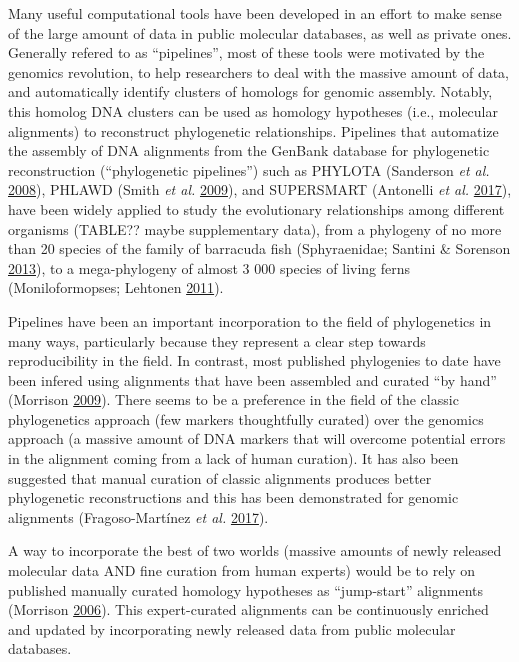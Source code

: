 \documentclass[]{article}
\begin{document}
Many useful computational tools have been developed in an effort to make sense of the large amount of data in public molecular databases, as well as private ones. Generally refered to as ``pipelines'', most of these tools were motivated by the genomics revolution, to help researchers to deal with the massive amount of data, and automatically identify clusters of homologs for genomic assembly. Notably, this homolog DNA clusters can be used as homology hypotheses (i.e., molecular alignments) to reconstruct phylogenetic relationships.
Pipelines that automatize the assembly of DNA alignments from the GenBank database for phylogenetic reconstruction (``phylogenetic pipelines'') such as PHYLOTA (Sanderson \emph{et al.} \protect\hyperlink{ref-sanderson2008phylota}{2008}), PHLAWD (Smith \emph{et al.} \protect\hyperlink{ref-smith2009mega}{2009}), and SUPERSMART (Antonelli \emph{et al.} \protect\hyperlink{ref-antonelli2017toward}{2017}), have been widely applied to study the evolutionary relationships among different organisms (TABLE?? maybe supplementary data), from a phylogeny of no more than 20 species of the family of barracuda fish (Sphyraenidae; Santini \& Sorenson \protect\hyperlink{ref-santini2013first}{2013}), to a mega-phylogeny of almost 3 000 species of living ferns (Moniloformopses; Lehtonen \protect\hyperlink{ref-lehtonen2011towards}{2011}).

Pipelines have been an important incorporation to the field of phylogenetics in many ways, particularly because they represent a clear step towards reproducibility in the field. In contrast, most published phylogenies to date have been infered using alignments that have been assembled and curated ``by hand'' (Morrison \protect\hyperlink{ref-morrison2009would}{2009}).
There seems to be a preference in the field of the classic phylogenetics approach (few markers thoughtfully curated) over the genomics approach (a massive amount of DNA markers that will overcome potential errors in the alignment coming from a lack of human curation).
It has also been suggested that manual curation of classic alignments produces better phylogenetic reconstructions and this has been demonstrated for genomic alignments (Fragoso-Martínez \emph{et al.} \protect\hyperlink{ref-fragoso2017pilot}{2017}).

A way to incorporate the best of two worlds (massive amounts of newly released molecular data AND fine curation from human experts) would be to rely on published manually curated homology hypotheses as ``jump-start'' alignments (Morrison \protect\hyperlink{ref-morrison2006multiple}{2006}). This expert-curated alignments can be continuously enriched and updated by incorporating newly released data from public molecular databases.
\end{document}
